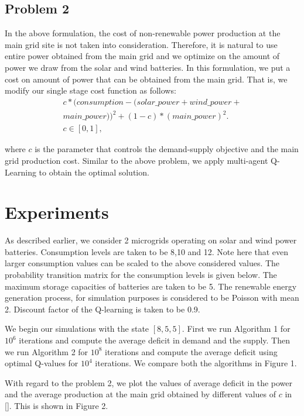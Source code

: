 \documentclass[conference]{IEEEtran}
\begin{document}
\subsection{Problem 2}
In the above formulation, the cost of non-renewable power production at the main grid site is not taken into consideration. Therefore, it is natural to use entire power obtained from the main grid and we optimize on the amount of power we draw from the solar and wind batteries. In this formulation, we put a cost on amount of power that can be obtained from the main grid. That is, we modify our single stage cost function as follows:
\begin{equation}
\begin{split}
 c*(consumption - (solar\_power + wind\_power+ \\
 main\_power))^2+(1-c)*(main\_power)^2.\\
 c \in[0,1],
 \end{split}
\end{equation}


where $c$ is the parameter that controls the demand-supply objective and the main grid production cost. 
Similar to the above problem, we apply multi-agent Q-Learning to obtain the optimal solution. 

\section{Experiments}
As described earlier, we consider 2 microgrids operating on solar and wind power batteries. Consumption levels are taken to be 8,10 and 12. Note here that even larger consumption values can be scaled to the above considered values. The probability transition matrix for the consumption levels is given below. The maximum storage capacities of batteries are taken to be 5. The renewable energy generation process, for simulation purposes is considered to be Poisson with mean 2. Discount factor of the Q-learning is taken to be 0.9.

We begin our simulations with the state $[8,5,5]$. First we run Algorithm 1 for $10^6$ iterations and compute the average deficit in demand and the supply. Then we run Algorithm 2 for $10^8$ iterations and compute the average deficit using optimal Q-values for $10^4$ iterations. We compare both the algorithms in Figure 1.

With regard to the problem 2, we plot the values of average deficit in the power and the average production at the main grid obtained by different values of $c$ in \eqref{}. This is shown in Figure 2. 
\end{document}
